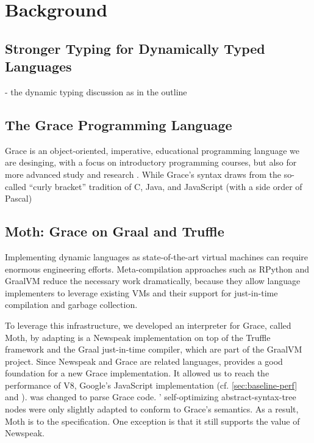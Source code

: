
\section{Background}
\label{sec:background}

\subsection{Stronger Typing for Dynamically Typed Languages}

\begin{cnote}
- the dynamic typing discussion as in the outline
\end{cnote}

\subsection{The Grace Programming Language}

Grace is an object-oriented, imperative, educational programming
language we are desinging, with a focus on introductory programming
courses, but also for more advanced study and research
\cite{graceAbsence,seekinGraceSIGCSE}.  While Grace's syntax draws
from the so-called ``curly bracket'' tradition of C, Java, and
JavaScript (with a side order of Pascal) 

\subsection{Moth: Grace on Graal and Truffle}
\label{ssec:moth}

Implementing dynamic languages as state-of-the-art virtual machines
can require enormous engineering efforts.
Meta-compilation approaches\citep{Marr:2015:MTPE}
such as RPython\citep{Bolz:2009:TMP,Bolz:2013:IMT}
and GraalVM\citep{Wurthinger2013,Wurthinger:2017:PPE}
reduce the necessary work dramatically,
because they allow language implementers to leverage existing VMs
and their support for just-in-time compilation and garbage collection.

To leverage this infrastructure, we developed an interpreter for Grace,
called Moth\citep{Roberts2017}, by adapting
\SOMns is a Newspeak implementation\citep{Bracha:10:NS} on top of the Truffle framework and the Graal just-in-time compiler,
which are part of the GraalVM project.
Since Newspeak and Grace are related languages,
\SOMns provides a good foundation for a new Grace implementation.
It allowed us to reach the performance of V8,
Google's JavaScript implementation
(cf. \cref{sec:baseline-perf} and \citet{Marr2016}).
\SOMns was changed to parse Grace code.
\SOMns' self-optimizing abstract-syntax-tree nodes were only slightly adapted to conform to Grace's semantics.
As a result, Moth is  to the specification.
One exception is that it still supports the  value of Newspeak.


